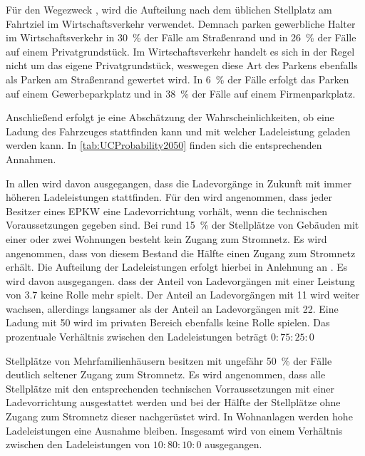 Für den Wegezweck \dienstdot, wird die Aufteilung nach dem üblichen Stellplatz am Fahrtziel im Wirtschaftsverkehr verwendet. \cite{Rikus2015}
Demnach parken gewerbliche Halter im Wirtschaftsverkehr in \SI{30}{\percent} der Fälle am Straßenrand und in \SI{26}{\percent} der Fälle auf einem Privatgrundstück.
Im Wirtschaftsverkehr handelt es sich in der Regel nicht um das eigene Privatgrundstück, weswegen diese Art des Parkens ebenfalls als Parken am Straßenrand gewertet wird.
In \SI{6}{\percent} der Fälle erfolgt das Parken auf einem Gewerbeparkplatz und in \SI{38}{\percent} der Fälle auf einem Firmenparkplatz.\medskip

Anschließend erfolgt je \UC eine Abschätzung der Wahrscheinlichkeiten, ob eine Ladung des Fahrzeuges stattfinden kann und mit welcher Ladeleistung geladen werden kann.
In \autoref{tab:UCProbability2050} finden sich die entsprechenden Annahmen.



In allen \UCs wird davon ausgegangen, dass die Ladevorgänge in Zukunft mit immer höheren Ladeleistungen stattfinden.
Für den \UC \Eigenheim wird angenommen, dass jeder Besitzer eines \gls{EPKW} eine Ladevorrichtung vorhält, wenn die technischen Voraussetzungen gegeben sind.
Bei rund \SI{15}{\percent} der Stellplätze von Gebäuden mit einer oder zwei Wohnungen besteht kein Zugang zum Stromnetz. \cite{dena2020}
Es wird angenommen, dass von diesem Bestand die Hälfte einen Zugang zum Stromnetz erhält.
Die Aufteilung der Ladeleistungen erfolgt hierbei in Anlehnung an \cite{NPZMAVE2020}.
Es wird davon ausgegangen. dass der Anteil von Ladevorgängen mit einer Leistung von \SI{3.7}{\kw} keine Rolle mehr spielt.
Der Anteil an Ladevorgängen mit \SI{11}{\kw} wird weiter wachsen, allerdings langsamer als der Anteil an Ladevorgängen mit \SI{22}{\kw}.
Eine Ladung mit \SI{50}{\kw} wird im privaten Bereich ebenfalls keine Rolle spielen.
Das prozentuale Verhältnis zwischen den Ladeleistungen beträgt \(0:75:25:0\)\medskip

Stellplätze von Mehrfamilienhäusern besitzen mit ungefähr \SI{50}{\percent} der Fälle deutlich seltener Zugang zum Stromnetz. \cite{dena2020}
Es wird angenommen, dass alle Stellplätze mit den entsprechenden technischen Vorraussetzungen mit einer Ladevorrichtung ausgestattet werden und bei der Hälfte der Stellplätze ohne Zugang zum Stromnetz dieser nachgerüstet wird.
In Wohnanlagen werden hohe Ladeleistungen eine Ausnahme bleiben.
Insgesamt wird von einem Verhältnis zwischen den Ladeleistungen von \(10:80:10:0\) ausgegangen.\medskip

